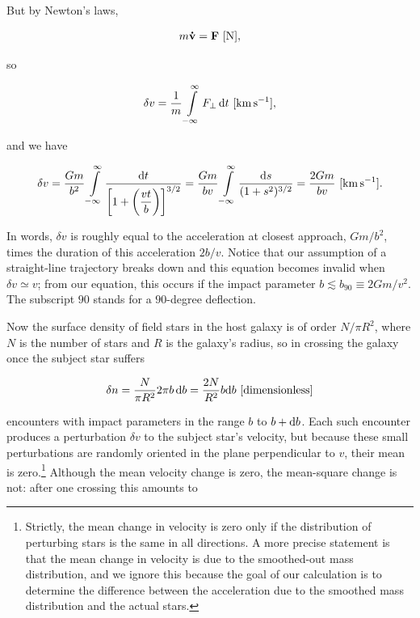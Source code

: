 \documentclass[a4paper,10pt]{article}
\begin{document}
{\noindent}But by Newton's laws,

\begin{align*}
    m\mathbf{\dot{v}} = \mathbf{F} ~ [{\rm N}],
\end{align*}

{\noindent}so

\begin{align*}
    \delta v = \frac{1}{m} \int\limits_{-\infty}^\infty F_\perp\,{\rm d}t ~ [{\rm km\,s^{-1}}],
\end{align*}

{\noindent}and we have

\begin{align*}
    \delta v = \frac{Gm}{b^2} \int\limits_{-\infty}^\infty \frac{{\rm d}t}{\left[ 1+\left(\dfrac{vt}{b}\right)\right]^{3/2}} = \frac{Gm}{bv} \int\limits_{-\infty}^\infty \frac{{\rm d}s}{(1+s^2)^{3/2}} = \frac{2Gm}{bv} ~ [{\rm km\,s^{-1}}].
\end{align*}

{\noindent}In words, $\delta v$ is roughly equal to the acceleration at closest approach, $Gm/b^2$, times the duration of this acceleration $2b/v$. Notice that our assumption of a straight-line trajectory breaks down and this equation becomes invalid when $\delta v\simeq v$; from our equation, this occurs if the impact parameter $b\lesssim b_{90}\equiv2Gm/v^2$. The subscript $90$ stands for a $90$-degree deflection.

{\noindent}Now the surface density of field stars in the host galaxy is of order $N/\pi R^2$, where $N$ is the number of stars and $R$ is the galaxy's radius, so in crossing the galaxy once the subject star suffers

\begin{align*}
    \delta n = \frac{N}{\pi R^2}2\pi b\,{\rm d}b = \frac{2N}{R^2}b{\rm d}b ~ [{\rm dimensionless}]
\end{align*}

{\noindent}encounters with impact parameters in the range $b$ to $b+{\rm d}b$. Each such encounter produces a perturbation $\delta v$ to the subject star's velocity, but because these small perturbations are randomly oriented in the plane perpendicular to $v$, their mean is zero.\footnote{Strictly, the mean change in velocity is zero only if the distribution of perturbing stars is the same in all directions. A more precise statement is that the mean change in velocity is due to the smoothed-out mass distribution, and we ignore this because the goal of our calculation is to determine the difference between the acceleration due to the smoothed mass distribution and the actual stars.} Although the mean velocity change is zero, the mean-square change is not: after one crossing this amounts to
\end{document}
